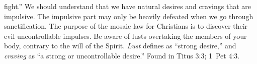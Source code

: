 fight.'' We should understand that we have natural desires and cravings that are impulsive. The impulsive part may only be heavily defeated when we go through sanctification. The purpose of the mosaic law for Christians is to discover their evil uncontrollable impulses. Be aware of lusts overtaking the members of your body, contrary to the will of the Spirit. \emph{Lust} defines as ``strong desire,'' and \emph{craving} as ``a strong or uncontrollable desire.''
Found in Titus 3:3; 1~Pet 4:3.



